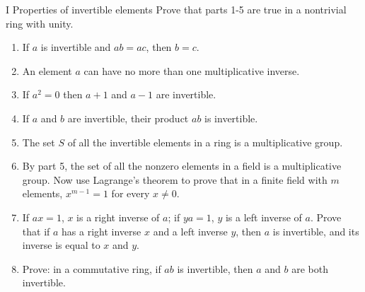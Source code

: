\begin{exercise}{I Properties of invertible elements}
Prove that parts 1-5 are true in a nontrivial ring with unity.
\begin{enumerate}
    \item If $a$ is invertible and $ab=ac$, then $b=c$.
    \item An element $a$ can have no more than one multiplicative inverse.
    \item If $a^{2}=0$ then $a+1$ and $a-1$ are invertible.
    \item If $a$ and $b$ are invertible, their product $ab$ is invertible.
    \item The set $S$ of all the invertible elements in a ring is a multiplicative group.
    \item By part 5, the set of all the nonzero elements in a field is a multiplicative group. Now use Lagrange's theorem to prove that in a finite field with $m$ elements, $x^{m-1}=1$ for every $x\neq 0$.
    \item If $ax=1$, $x$ is a right inverse of $a$; if $ya=1$, $y$ is a left inverse of $a$. Prove that if $a$ has a right inverse $x$ and a left inverse $y$, then $a$ is invertible, and its inverse is equal to $x$ and $y$.
    \item Prove: in a commutative ring, if $ab$ is invertible, then $a$ and $b$ are both invertible.
\end{enumerate}
\end{exercise}
